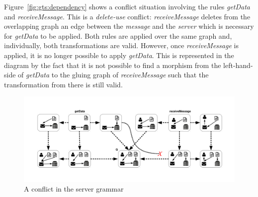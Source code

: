\begin{example}
  Figure~\ref{fig:gts:dependency} shows a conflict situation involving the rules \emph{getData} and \emph{receiveMessage}. This is a \emph{delete-use} conflict: \emph{receiveMessage} deletes from the overlapping graph an edge between the \emph{message} and the \emph{server} which is necessary for \emph{getData} to be applied. Both rules are applied over the same graph and, individually, both transformations are valid. However, once \emph{receiveMessage} is applied, it is no longer possible to
  apply \emph{getData}. This is represented in the diagram by the fact that it is not possible to find a morphism from the left-hand-side of \emph{getData} to the gluing graph of \emph{receiveMessage} such that the transformation from there is still valid.

\begin{figure}[!ht]
  \centering
  \includegraphics[scale=0.5]{images/gts/conflict}
  \caption{A conflict in the server grammar}\label{fig:gts:conflict}
\end{figure}

\end{example}
